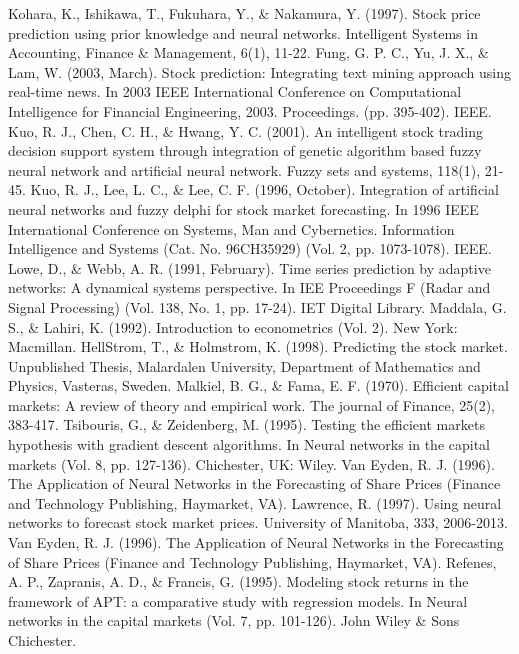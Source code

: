 \documentclass[a4paper,12pt]{report}
\begin{document}
\begin{fig}
\begin{thebibliography}{9}
	Kohara, K., Ishikawa, T., Fukuhara, Y., \& Nakamura, Y. (1997). Stock price prediction using prior knowledge and neural networks. Intelligent Systems in Accounting, Finance \& Management, 6(1), 11-22.
	Fung, G. P. C., Yu, J. X., \& Lam, W. (2003, March). Stock prediction: Integrating text mining approach using real-time news. In 2003 IEEE International Conference on Computational Intelligence for Financial Engineering, 2003. Proceedings. (pp. 395-402). IEEE.
	Kuo, R. J., Chen, C. H., \& Hwang, Y. C. (2001). An intelligent stock trading decision support system through integration of genetic algorithm based fuzzy neural network and artificial neural network. Fuzzy sets and systems, 118(1), 21-45.
	Kuo, R. J., Lee, L. C., \& Lee, C. F. (1996, October). Integration of artificial neural networks and fuzzy delphi for stock market forecasting. In 1996 IEEE International Conference on Systems, Man and Cybernetics. Information Intelligence and Systems (Cat. No. 96CH35929) (Vol. 2, pp. 1073-1078). IEEE.
	Lowe, D., \& Webb, A. R. (1991, February). Time series prediction by adaptive networks: A dynamical systems perspective. In IEE Proceedings F (Radar and Signal Processing) (Vol. 138, No. 1, pp. 17-24). IET Digital Library.
	Maddala, G. S., \& Lahiri, K. (1992). Introduction to econometrics (Vol. 2). New York: Macmillan.
	HellStrom, T., \& Holmstrom, K. (1998). Predicting the stock market. Unpublished Thesis, Malardalen University, Department of Mathematics and Physics, Vasteras, Sweden.
	Malkiel, B. G., \& Fama, E. F. (1970). Efficient capital markets: A review of theory and empirical work. The journal of Finance, 25(2), 383-417.
	Tsibouris, G., \& Zeidenberg, M. (1995). Testing the efficient markets hypothesis with gradient descent algorithms. In Neural networks in the capital markets (Vol. 8, pp. 127-136). Chichester, UK: Wiley.
	Van Eyden, R. J. (1996). The Application of Neural Networks in the Forecasting of Share Prices (Finance and Technology Publishing, Haymarket, VA).
	Lawrence, R. (1997). Using neural networks to forecast stock market prices. University of Manitoba, 333, 2006-2013.
	Van Eyden, R. J. (1996). The Application of Neural Networks in the Forecasting of Share Prices (Finance and Technology Publishing, Haymarket, VA).
	Refenes, A. P., Zapranis, A. D., \& Francis, G. (1995). Modeling stock returns in the framework of APT: a comparative study with regression models. In Neural networks in the capital markets (Vol. 7, pp. 101-126). John Wiley \& Sons Chichester.

\end{thebibliography}
\end{fig}
\end{document}
